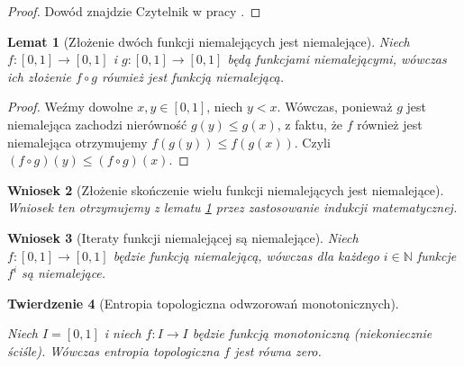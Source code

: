 \documentclass[licencjacka]{pwr_wmat_praca_dyplomowa}
\theoremstyle{plain}
\newtheorem{theorem}{Twierdzenie}
\numberwithin{theorem}{chapter}
\newtheorem{lemma}[theorem]{Lemat}
\newtheorem{corollary}[theorem]{Wniosek}
\theoremstyle{definition}
\numberwithin{theorem}{chapter}
\begin{document}
\begin{proof}
Dowód znajdzie Czytelnik w pracy \cite[s.~59]{ruette2017chaos}.
\end{proof}

 

\begin{lemma}[Złożenie dwóch funkcji niemalejących jest niemalejące]
\label{zlozenie_dwoch_niemalejacych_jest_niemalejace}
Niech $f: [0, 1] \rightarrow [0, 1]$ i $g: [0, 1] \rightarrow [0,1]$ będą funkcjami niemalejącymi, wówczas ich złożenie $f \circ g$ również jest funkcją niemalejącą. 
\end{lemma}

\begin{proof}
Weźmy dowolne $x, y \in [0,1]$, niech $y < x$. Wówczas, ponieważ $g$ jest niemalejąca zachodzi nierówność $g(y) \leq g(x)$, z faktu, że $f$ również jest niemalejąca otrzymujemy $f(g(y)) \leq f(g(x)).$ Czyli $(f \circ g)(y) \leq (f \circ g)(x).$
\end{proof} 

\begin{corollary}[Złożenie skończenie wielu funkcji niemalejących jest niemalejące]
\label{zlozenie_skonczenie_wielu_niemalejacych_jest_niemalejace}
Wniosek ten otrzymujemy z lematu \ref{zlozenie_dwoch_niemalejacych_jest_niemalejace} przez zastosowanie indukcji matematycznej.
\end{corollary}

\begin{corollary}[Iteraty funkcji niemalejącej są niemalejące]
\label{iteraty_niemalejacych_sa_niemalejace}
Niech $f: [0, 1] \rightarrow [0, 1]$ będzie funkcją niemalejącą, wówczas dla każdego $i \in \mathbb{N}$ funkcje $f^{i}$ są niemalejące.
\end{corollary}

 
 
\begin{theorem}[Entropia topologiczna odwzorowań monotonicznych]
\label{entropia_topologiczna_odwzorowan_monotonicznych}

Niech $I = [0, 1]$ i niech $f: I \rightarrow I$ będzie funkcją monotoniczną (niekoniecznie ściśle).
Wówczas entropia topologiczna $f$ jest równa zero.
\end{theorem}
\end{document}
